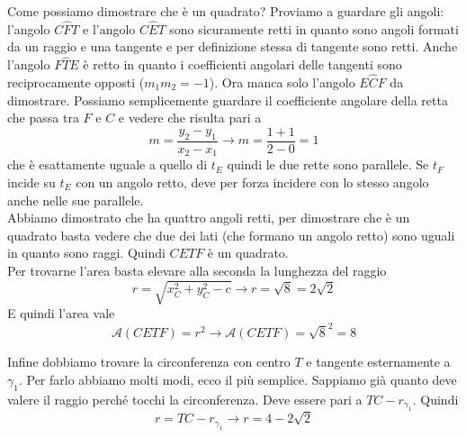 Come possiamo dimostrare che è un quadrato? Proviamo a guardare gli angoli: l'angolo $C\widehat{F}T$
e l'angolo $C\widehat{E}T$ sono sicuramente retti in quanto sono angoli formati da un raggio e una 
tangente e per definizione stessa di tangente sono retti. Anche l'angolo $F\widehat{T}E$ è retto in
quanto i coefficienti angolari delle tangenti sono reciprocamente opposti ($m_1m_2=-1$). Ora manca
solo l'angolo $E\widehat{C}F$ da dimostrare. Possiamo semplicemente guardare il coefficiente angolare
della retta che passa tra $F$ e $C$ e vedere che risulta pari a 
\begin{equation*}
m = \frac{y_2-y_1}{x_2-x_1} \rightarrow m= \frac{1+1}{2-0} = 1
\end{equation*}
che è esattamente uguale a quello di $t_E$ quindi le due rette sono parallele. Se $t_F$ incide su 
$t_E$ con un angolo retto, deve per forza incidere con lo stesso angolo anche nelle sue parallele.\\
Abbiamo dimostrato che ha quattro angoli retti, per dimostrare che è un quadrato basta vedere che due
dei lati (che formano un angolo retto) sono uguali in quanto sono raggi. Quindi $CETF$ è un 
quadrato.\\
Per trovarne l'area basta elevare alla seconda la lunghezza del raggio
\begin{equation*}
r = \sqrt{x_C^2+y_C^2-c} \rightarrow r = \sqrt{8} = 2\sqrt{2}
\end{equation*}
E quindi l'area vale
\begin{equation*}
\mathscr{A}(CETF) = r^2 \rightarrow \mathscr{A}(CETF) = \sqrt{8}^2 = 8
\end{equation*}

Infine dobbiamo trovare la circonferenza con centro $T$ e tangente esternamente a $\gamma_1$. Per 
farlo abbiamo molti modi, ecco il più semplice. Sappiamo già quanto deve valere il raggio perché 
tocchi la circonferenza. Deve essere pari a $TC-r_{\gamma_1}$. Quindi
\begin{equation*}
r = TC-r_{\gamma_1} \rightarrow r = 4-2\sqrt{2}
\end{equation*}


